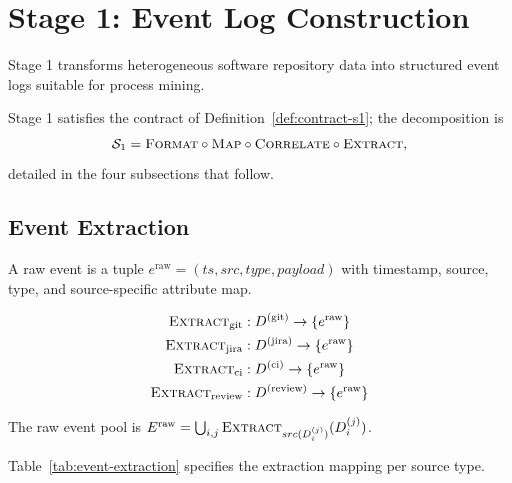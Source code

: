 \section{Stage 1: Event Log Construction}
\label{sec:stage1}

Stage 1 transforms heterogeneous software repository data into structured
event logs suitable for process mining.

Stage 1 satisfies the contract of
Definition~\ref{def:contract-s1}; the decomposition is
\begin{equation}
\label{eq:s1-decomposition}
\mathcal{S}_1 = \textsc{Format} \circ \textsc{Map} \circ \textsc{Correlate} \circ \textsc{Extract},
\end{equation}
detailed in the four subsections that follow.


\subsection{Event Extraction}
\label{sec:s1-extraction}

\begin{definition}
\label{def:raw-event}
A raw event is a tuple $e^{\text{raw}} = (ts, src, type, payload)$ with
timestamp, source, type, and source-specific attribute map.
\end{definition}

\begin{definition}
\label{def:extractors}
\begin{align}
\textsc{Extract}_{\text{git}}    &: D^{(\text{git})} \to \{e^{\text{raw}}\}  \\
\textsc{Extract}_{\text{jira}}   &: D^{(\text{jira})} \to \{e^{\text{raw}}\} \\
\textsc{Extract}_{\text{ci}}     &: D^{(\text{ci})} \to \{e^{\text{raw}}\}   \\
\textsc{Extract}_{\text{review}} &: D^{(\text{review})} \to \{e^{\text{raw}}\}
\end{align}
\end{definition}

The raw event pool is
$E^{\text{raw}} = \bigcup_{i,j} \textsc{Extract}_{src(D_i^{(j)})}(D_i^{(j)})$.

Table~\ref{tab:event-extraction} specifies the extraction mapping per
source type.

